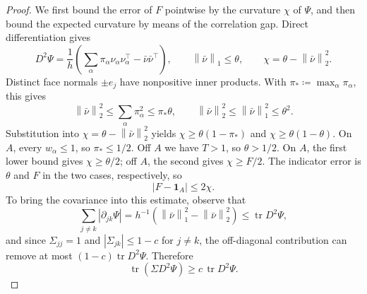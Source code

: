 \documentclass[11pt,letterpaper]{article}
\theoremstyle{remark}
\newcommand{\tr}{\operatorname{tr}}
\newcommand{\norm}[1]{\left\lVert#1\right\rVert}
\newcommand{\ind}{\mathbf 1}
\begin{document}
\begin{proof}
We first bound the error of \(F\) pointwise by the curvature
\(\chi\) of \(\Psi\), and then bound the expected curvature by means of
the correlation gap. Direct differentiation gives
\begin{equation}
 D^2\Psi=\frac1h\left(
 \sum_\alpha\pi_\alpha\nu_\alpha\nu_\alpha^\top-\bar\nu\bar\nu^\top\right),
 \qquad \norm{\bar\nu}_1\le\theta,\qquad
 \chi=\theta-\norm{\bar\nu}_2^2.
 \label{appx-eq:hessian}
\end{equation}
Distinct face normals \(\pm e_j\) have nonpositive inner products.
With \(\pi_*\coloneqq\max_\alpha\pi_\alpha\), this gives
\[
 \norm{\bar\nu}_2^2\le\sum_\alpha\pi_\alpha^2\le\pi_*\theta,
 \qquad
 \norm{\bar\nu}_2^2\le\norm{\bar\nu}_1^2\le\theta^2.
\]
Substitution into \(\chi=\theta-\norm{\bar\nu}_2^2\) yields
\(\chi\ge\theta(1-\pi_*)\) and \(\chi\ge\theta(1-\theta)\).
On \(A\), every \(w_\alpha\le1\), so \(\pi_*\le1/2\).
Off \(A\) we have \(T>1\), so \(\theta>1/2\). On \(A\), the first
lower bound gives \(\chi\ge\theta/2\); off \(A\), the second gives
\(\chi\ge F/2\). The indicator error is \(\theta\) and \(F\)
in the two cases, respectively, so
\begin{equation}
 |F-\ind_A|\le2\chi.
 \label{appx-eq:curvature-error}
\end{equation}
To bring the covariance into this estimate, observe that
\[
 \sum_{j\ne k}|\partial_{jk}\Psi|
 =h^{-1}(\norm{\bar\nu}_1^2-\norm{\bar\nu}_2^2)
 \le\tr D^2\Psi,
\]
and since \(\Sigma_{jj}=1\) and \(|\Sigma_{jk}|\le1-c\) for
\(j\ne k\), the off-diagonal contribution can remove at most
\((1-c)\tr D^2\Psi\). Therefore
\begin{equation}
 \tr(\Sigma D^2\Psi)\ge c\,\tr D^2\Psi.
 \label{appx-eq:gap-contraction}
\end{equation}


\end{proof}
\end{document}
